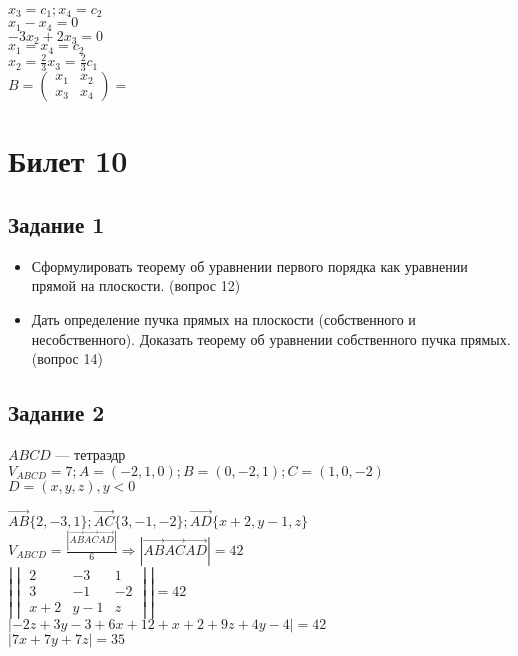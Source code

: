 \documentclass[a4paper]{article}
\theoremstyle{definition}
\theoremstyle{plain}
\begin{document}
$
x_{3} = c_{1}; x_{4} = c_{2}
$\\
$
x_{1} - x_{4} = 0
$\\
$
-3x_{2} + 2x_{3} = 0
$\\
$
x_{1} = x_{4} = c_{2}
$\\
$
x_{2} = \frac{2}{3}x_{3} = \frac{2}{3}c_{1}
$\\
$
B =
\begin{pmatrix}
  x_{1} & x_{2}\\
  x_{3} & x_{4}
\end{pmatrix}
=
$

\section*{Билет 10}
\subsection*{Задание 1}
\begin{itemize}
\item
Сформулировать теорему об уравнении первого порядка как уравнении прямой на плоскости.
(вопрос 12)
\item
Дать определение пучка прямых на плоскости (собственного и несобственного).
Доказать теорему об уравнении собственного пучка прямых.
(вопрос 14)
\end{itemize}
\subsection*{Задание 2}
$ABCD$ --- тетраэдр\\
$V_{ABCD} = 7; A = (-2,1,0); B = (0, -2, 1); C = (1, 0, -2)$\\
$D = (x, y, z), y < 0$

$\vec{AB}\{2, -3, 1\}; \vec{AC}\{3, -1, -2\}; \vec{AD}\{x + 2, y - 1, z\}$\\
$V_{ABCD} = \frac{\left| \vec{AB}\vec{AC}\vec{AD} \right|}{6} \Rightarrow \left|\vec{AB}\vec{AC}\vec{AD}\right| = 42$\\
$\left| \begin{vmatrix}
  2 & -3 & 1\\
  3 & -1 & -2\\
  x+2 & y-1 & z
\end{vmatrix} \right|
= 42$\\
$\left|-2z + 3y - 3 + 6x + 12 + x + 2 + 9z + 4y - 4\right| = 42$\\
$\left| 7x + 7y + 7z \right| = 35$\\
\end{document}
